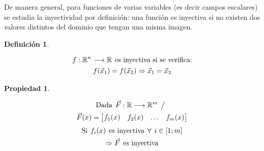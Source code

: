 \documentclass[a5paper,12pt,twoside]{book}
\newtheorem{defn}{{Definición}}[chapter]
\newtheorem{prop}{{Propiedad}}[chapter]
\begin{document}
De manera general, para funciones de varias variables (es decir campos escalares) se estudia la inyectividad por definición: una función es inyectiva si no existen dos valores distintos del dominio que tengan una misma imagen.

\begin{mdframed}[style=MyFrame1]
    \begin{defn}
    \end{defn}
    \begin{gather*}
        f: \mathbb{R}^n \longrightarrow \mathbb{R} \hspace{1ex} \textrm{es inyectiva si se verifica:}
        \\
        f(\Vec{x}_1)=f(\Vec{x}_2) \Rightarrow \Vec{x}_1=\Vec{x}_2
    \end{gather*}
\end{mdframed}

\begin{mdframed}[style=MyFrame1]
    \begin{prop}
    \end{prop}
    \begin{multline*}
        \textrm{Dada} \hspace{1ex} \Vec{F}: \mathbb{R} \longrightarrow \mathbb{R}^m \hspace{1ex} \big/ \hspace{1ex}
        \\
        \Vec{F}(x) = \begin{bmatrix} f_1(x) & f_2(x) & \ldots & f_m(x) \end{bmatrix}
    \end{multline*}
    \begin{gather*}
        \textrm{Si} \hspace{1ex} f_i(x) \hspace{1ex} \textrm{es inyectiva} \hspace{1ex} \forall \hspace{1ex} i \in [1;m]
        \\
        \Rightarrow \Vec{F} \hspace{1ex} \textrm{es inyectiva}
    \end{gather*}
\end{mdframed}
\end{document}
